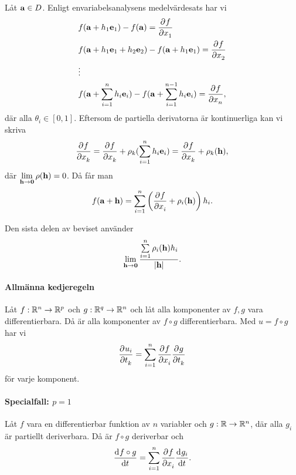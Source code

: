 \proof
Låt $\vect{a}\in D$. Enligt envariabelsanalysens medelvärdesats har vi
\begin{align*}
	&f(\vect{a} + h_1\vect{e}_1) - f(\vect{a}) = \pdeval{f}{x_1}{\vect{a} + \theta _1h_1\vect{e}_1} \\
	&f(\vect{a} + h_1\vect{e}_1 + h_2\vect{e}_2) - f(\vect{a} + h_1\vect{e}_1) = \pdeval{f}{x_2}{\vect{a} + h_1\vect{e}_1 + \theta_2h_2\vect{e}_2} \\
	&\vdots \\
	&f(\vect{a} + \sum\limits_{i = 1}^{n}h_i\vect{e}_i) - f(\vect{a} + \sum\limits_{i = 1}^{n - 1}h_i\vect{e}_i) = \pdeval{f}{x_n}{\vect{a} + \sum\limits_{i = 1}^{n - 1}h_i\vect{e}_i + \theta_nh_n\vect{e}_n},
\end{align*}
där alla $\theta_i\in [0, 1]$. Eftersom de partiella derivatorna är kontinuerliga kan vi skriva
\begin{align*}
	\pdeval{f}{x_k}{\vect{a} + \sum\limits_{i = 1}^{k - 1}h_i\vect{e}_i + \theta_kh_k\vect{e}_k} = \pdeval{f}{x_k}{\vect{a}} + \rho_k(\sum\limits_{i = 1}^{n}h_i\vect{e}_i) = \pdeval{f}{x_k}{\vect{a}} + \rho_k(\vect{h}),
\end{align*}
där $\limit{\vect{h}}{\vect{0}}\rho(\vect{h}) = 0$. Då får man
\begin{align*}
	f(\vect{a} + \vect{h}) = \sum\limits_{i = 1}^{n}\left(\pdeval{f}{x_i}{\vect{a}} + \rho_i(\vect{h})\right)h_i.
\end{align*}

Den sista delen av beviset använder
\begin{align*}
	\limit{\vect{h}}{\vect{0}}\frac{\sum\limits_{i = 1}^{n}\rho_i(\vect{h})h_i}{\abs{\vect{h}}}.
\end{align*}

\paragraph{Allmänna kedjeregeln}
Låt $f: \mathbb{R}^n\to\mathbb{R}^p$ och $g: \mathbb{R}^q\to\mathbb{R}^n$ och låt alla komponenter av $f, g$ vara differentierbara. Då är alla komponenter av $f\circ g$ differentierbara. Med $u = f\circ g$ har vi
\begin{align*}
	\pdeval{u_i}{t_k}{\vect{t}} = \sum\limits_{i = 1}^{n}\pdeval{f}{x_i}{g(\vect{t})}\pdeval{g}{t_k}{\vect{t}}
\end{align*}
för varje komponent.

\paragraph{Specialfall: $p = 1$}
Låt $f$ vara en differentierbar funktion av $n$ variabler och $g: \mathbb{R}\to\mathbb{R}^n$, där alla $g_i$ är partiellt deriverbara. Då är $f\circ g$ deriverbar och
\begin{align*}
	\dv[]{f\circ g}{t} (t) = \sum\limits_{i = 1}^{n}\pdv[]{f}{x_i} (g(t))\dv[]{g_i}{t} (t).
\end{align*}

